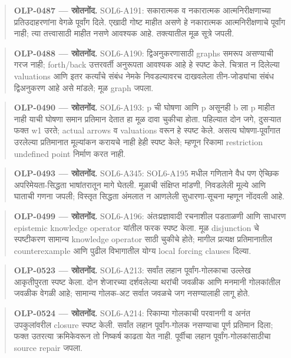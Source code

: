 \begin{quote}\small\textbf{OLP-0487 — स्रोतनोंद.} SOL6-A191: सकारात्मक व नकारात्मक आत्मनिरीक्षणाच्या प्रतिउदाहरणांना वेगळे पूर्वांग दिले. एखादी गोष्ट माहीत असणे हे नकारात्मक आत्मनिरीक्षणाचे पूर्वांग नाही; त्या तत्त्वासाठी माहीत नसणे आवश्यक आहे. तक्त्यातील मूळ सूत्रे जपली.\end{quote}
\begin{quote}\small\textbf{OLP-0488 — स्रोतनोंद.} SOL6-A190: द्विअनुकरणासाठी graphs समरूप असण्याची गरज नाही; forth/back उत्तरवर्ती अनुरूपता आवश्यक आहे हे स्पष्ट केले. चित्रात न दिलेल्या valuations आणि इतर कर्त्यांचे संबंध नेमके निवडल्यावरच दाखवलेला तीन-जोड्यांचा संबंध द्विअनुकरण आहे असे मांडले; मूळ graph जपला.\end{quote}
\begin{quote}\small\textbf{OLP-0490 — स्रोतनोंद.} SOL6-A193: p ची घोषणा आणि p असूनही b ला p माहीत नाही याची घोषणा समान प्रतिमान देतात हा मूळ दावा चुकीचा होता. पहिल्यात दोन जगे, दुसऱ्यात फक्त w1 उरते; actual arrows व valuations वरून हे स्पष्ट केले. असत्य घोषणा-पूर्वांगात उरलेल्या प्रतिमानात मूल्यांकन करायचे नाही हेही स्पष्ट केले; म्हणून रिकामा restriction undefined point निर्माण करत नाही.\end{quote}
\begin{quote}\small\textbf{OLP-0493 — स्रोतनोंद.} SOL6-A345: SOL6-A195 मधील गणिताने वैध पण ऐच्छिक अपरिमेयता-सिद्धता भाषांतरातून मागे घेतली. मूळाची संक्षिप्त मांडणी, निवडलेली मूल्ये आणि घाताची गणना जपली; विस्तृत सिद्धता अंमलात न आणलेली सुधारणा-सूचना म्हणून नोंदवली आहे.\end{quote}
\begin{quote}\small\textbf{OLP-0499 — स्रोतनोंद.} SOL6-A196: अंतःप्रज्ञावादी रचनाशील पडताळणी आणि साधारण epistemic knowledge operator यांतील फरक स्पष्ट केला. मूळ disjunction चे स्पष्टीकरण सामान्य knowledge operator साठी चुकीचे होते; मागील प्रत्यक्ष प्रतिमानातील counterexample आणि पुढील विभागातील योग्य local forcing clauses दिल्या.\end{quote}
\begin{quote}\small\textbf{OLP-0523 — स्रोतनोंद.} SOL6-A213: सर्वांत लहान पूर्वांग-गोलकाचा उल्लेख आकृतीपुरता स्पष्ट केला. दोन शेजारच्या दर्शवलेल्या थरांची जवळीक आणि मनमानी गोलकांतील जवळीक वेगळी आहे; सामान्य गोलक-अट सर्वात जवळचे जग नसण्यालाही लागू होते.\end{quote}
\begin{quote}\small\textbf{OLP-0524 — स्रोतनोंद.} SOL6-A214: रिकाम्या गोलकाची परवानगी व अनंत उपकुलांवरील closure स्पष्ट केली. सर्वांत लहान पूर्वांग-गोलक नसण्याचा पूर्ण प्रतिमान दिला; फक्त उतरत्या क्रमिकेवरून तो निष्कर्ष काढता येत नाही. पूर्वीचा लहान पूर्वांग-गोलकांसाठीचा source repair जपला.\end{quote}
